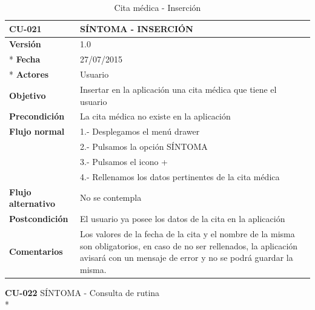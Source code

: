 \documentclass[../pfc.tex]{subfiles}
\begin{document}
		\begin{table}[H]
			\centering
			\begin{tabular}[t]{|p{3cm}|p{9.5cm}|}
				\hline \textbf{CU-021} & \textbf{SÍNTOMA - INSERCIÓN} \\*
				\hline\hline \textbf{Versión} & 1.0 \\ *
				\hline\hline \textbf{Fecha} & 27/07/2015 \\ *
				\hline\textbf{Actores} 	& Usuario\\*
				\hline \textbf{Objetivo} & Insertar en la aplicación una cita médica que tiene el usuario\\* 			
				\hline \textbf{Precondición} & La cita médica no existe en la aplicación\\* 
				\hline \textbf{Flujo normal} & 1.- Desplegamos el menú drawer \\* 
				& 2.- Pulsamos la opción SÍNTOMA\\*	
				& 3.- Pulsamos el icono +\\*	
				& 4.- Rellenamos los datos pertinentes de la cita médica\\*	
				\hline \textbf{Flujo alternativo} & No se contempla \\* 
				\hline \textbf{Postcondición} & El usuario ya posee los datos de la cita en la aplicación \\* 
				\hline \textbf{Comentarios}   & Los valores de la fecha de la cita y el nombre de la misma son obligatorios, en caso de no ser rellenados, la aplicación avisará con un mensaje de error y no se podrá guardar la misma.\\*
				\hline
			\end{tabular}
			\caption{Cita médica - Inserción}
			\label{tabla:caso021}
		\end{table}
		
		
		
		
		\textbf{CU-022}	SÍNTOMA - Consulta de rutina\\*
		
\end{document}
